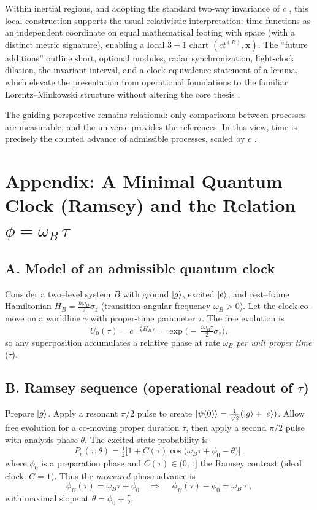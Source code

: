 \documentclass[12pt]{article}
\begin{document}
\medskip
\noindent
Within inertial regions, and adopting the standard two-way invariance of \(c\) \cite{Einstein1905},
this local construction supports the usual relativistic interpretation: time functions as an independent
coordinate on equal mathematical footing with space (with a distinct metric signature), enabling a
local \(3{+}1\) chart \((ct^{(B)},\mathbf{x})\). The “future additions” outline short, optional
modules, radar synchronization, light-clock dilation, the invariant interval, and a clock-equivalence statement of a lemma, which elevate the presentation from operational foundations to the familiar
Lorentz–Minkowski structure without altering the core thesis \cite{Rindler2006,Minkowski1908}.

\medskip
\noindent
The guiding perspective remains relational: only comparisons between processes are measurable,
and the universe provides the references. In this view, time is precisely the counted advance
of admissible processes, scaled by \(c\) \cite{RovelliPartial}.

\newpage

\appendix
\section*{Appendix: A Minimal Quantum Clock (Ramsey) and the Relation \(\phi=\omega_B\,\tau\)}

\subsection*{A. Model of an admissible quantum clock}
Consider a two–level system \(B\) with ground \(\ket{g}\), excited \(\ket{e}\), and rest–frame
Hamiltonian \(H_B=\tfrac{\hbar\omega_B}{2}\sigma_z\) (transition angular frequency \(\omega_B>0\)).
Let the clock co-move on a worldline \(\gamma\) with proper-time parameter \(\tau\). The free
evolution is
\[
U_0(\tau)=e^{-\,\tfrac{i}{\hbar}H_B\,\tau}
=\exp\!\Big(-\,\tfrac{i\omega_B\tau}{2}\sigma_z\Big),
\]
so any superposition accumulates a relative phase at rate \(\omega_B\) \emph{per unit proper time}
(\(\tau\)). \cite{Ramsey1950}

\subsection*{B. Ramsey sequence (operational readout of \(\tau\))}
Prepare \(\ket{g}\). Apply a resonant \(\pi/2\) pulse to create
\(\ket{\psi(0)}=\tfrac{1}{\sqrt{2}}(\ket{g}+\ket{e})\). Allow free evolution for a
co-moving proper duration \(\tau\), then apply a second \(\pi/2\) pulse with analysis
phase \(\theta\). The excited-state probability is
\[
P_e(\tau;\theta)=\tfrac{1}{2}\Big[1+C(\tau)\cos\!\big(\omega_B\tau+\phi_0-\theta\big)\Big],
\]
where \(\phi_0\) is a preparation phase and \(C(\tau)\in(0,1]\) the Ramsey contrast
(ideal clock: \(C=1\)). Thus the \emph{measured} phase advance is
\[
\phi_B(\tau)=\omega_B \tau+\phi_0 \quad\Rightarrow\quad
\boxed{\ \phi_B(\tau)-\phi_0=\omega_B\,\tau\ }\!,
\]
with maximal slope at \(\theta=\phi_0+\tfrac{\pi}{2}\). \cite{Ramsey1950}
\end{document}
